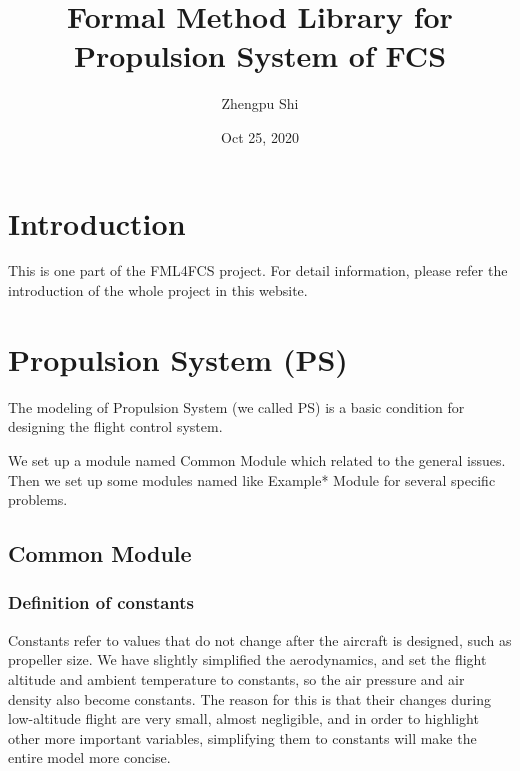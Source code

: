 \documentclass{article} %
\title{Formal Method Library for Propulsion System of FCS}
\author{Zhengpu Shi}
\affil{Draft V1.0}
\date{Oct 25, 2020} %
\numberwithin{equation}{section} %
\begin{document}
\maketitle
\newpage

\tableofcontents
\newpage



\section{Introduction}
This is one part of the FML4FCS project. 
For detail information, please refer the introduction of the whole project in this website.


\newpage

\section{Propulsion System (PS)}

The modeling of Propulsion System (we called PS) is a basic condition for designing the flight control system.

We set up a module named Common Module which related to the general issues.
Then we set up some modules named like Example* Module for several specific problems.

\subsection{Common Module}

\subsubsection{Definition of constants}
Constants refer to values that do not change after the aircraft is designed, such as propeller size.
We have slightly simplified the aerodynamics, and set the flight altitude and ambient temperature to constants, so the air pressure and air density also become constants. 
The reason for this is that their changes during low-altitude flight are very small, almost negligible, and in order to highlight other more important variables, simplifying them to constants will make the entire model more concise.
\end{document}
